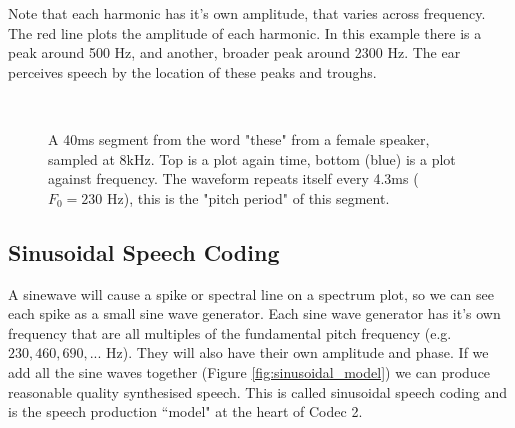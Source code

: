 \documentclass{article}
\begin{document}
Note that each harmonic has it's own amplitude, that varies across frequency.  The red line plots the amplitude of each harmonic. In this example there is a peak around 500 Hz, and another, broader peak around 2300 Hz.  The ear perceives speech by the location of these peaks and troughs.

\begin{figure}[H]
\caption{ A 40ms segment from the word "these" from a female speaker, sampled at 8kHz. Top is a plot again time, bottom (blue) is a plot against frequency. The waveform repeats itself every 4.3ms ($F_0=230$ Hz), this is the "pitch period" of this segment.}
\label{fig:hts2a_time}
\begin{center}

\\

\end{center}
\end{figure}

\subsection{Sinusoidal Speech Coding}

A sinewave will cause a spike or spectral line on a spectrum plot, so we can see each spike as a small sine wave generator.  Each sine wave generator has it's own frequency that are all multiples of the fundamental pitch frequency (e.g. $230, 460, 690,...$ Hz).  They will also have their own amplitude and phase.  If we add all the sine waves together (Figure \ref{fig:sinusoidal_model}) we can produce reasonable quality synthesised speech.  This is called sinusoidal speech coding and is the speech production ``model" at the heart of Codec 2.
\end{document}
